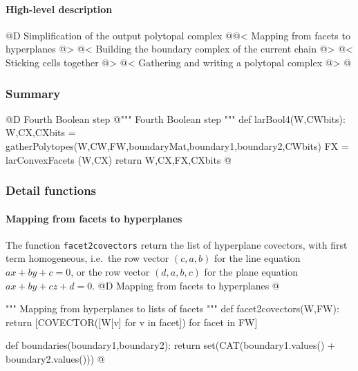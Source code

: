 \documentclass[11pt,oneside]{article}	%
\begin{document}
\paragraph{High-level description}

@D Simplification of the output polytopal complex
@{@< Mapping from facets to hyperplanes @>
@< Building the boundary complex of the current chain @>
@< Sticking cells together @>
@< Gathering and writing a polytopal complex @>
@}

\subsubsection{Summary}


@D Fourth Boolean step
@{""" Fourth Boolean step """
def larBool4(W,CWbits):
	W,CX,CXbits = gatherPolytopes(W,CW,FW,boundaryMat,boundary1,boundary2,CWbits)
	FX = larConvexFacets (W,CX)		
	return W,CX,FX,CXbits
@}



\subsubsection{Detail functions}




\paragraph{Mapping from facets to hyperplanes}
The function \texttt{facet2covectors} return the list of hyperplane covectors, with first term homogeneous, i.e.~the row vector $(c,a,b)$ for the line equation $ax+by+c=0$, or the row vector $(d,a,b,c)$ for the plane equation $ax+by+cz+d=0$.
@D Mapping from facets to hyperplanes
@{""" Mapping from hyperplanes to lists of facets """
def facet2covectors(W,FW):
	return [COVECTOR([W[v] for v in facet]) for facet in FW]

def boundaries(boundary1,boundary2):
	return set(CAT(boundary1.values() + boundary2.values()))
@}
\end{document}

